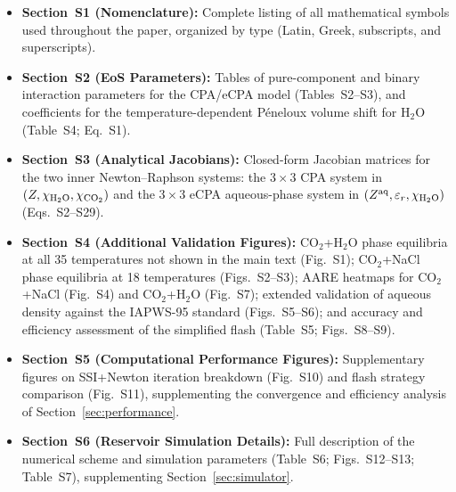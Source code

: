 \documentclass[preprint,12pt,number]{elsarticle}
\begin{document}
\begin{itemize}
  \item \textbf{Section~S1 (Nomenclature):}
        Complete listing of all mathematical symbols used throughout the paper,
        organized by type (Latin, Greek, subscripts, and superscripts).

  \item \textbf{Section~S2 (EoS Parameters):}
        Tables of pure-component and binary interaction parameters for the CPA/eCPA
        model (Tables~S2--S3), and coefficients for the temperature-dependent
        Péneloux volume shift for H$_2$O (Table~S4; Eq.~S1).

  \item \textbf{Section~S3 (Analytical Jacobians):}
        Closed-form Jacobian matrices for the two inner Newton--Raphson systems:
        the $3\times 3$ CPA system in $(Z,\chi_{\rm H_2O},\chi_{\rm CO_2})$
        and the $3\times 3$ eCPA aqueous-phase system in
        $(Z^{\rm aq},\varepsilon_r,\chi_{\rm H_2O})$ (Eqs.~S2--S29).

  \item \textbf{Section~S4 (Additional Validation Figures):}
        CO$_2$+H$_2$O phase equilibria at all 35 temperatures not shown in the main
        text (Fig.~S1); CO$_2$+NaCl phase equilibria at 18 temperatures
        (Figs.~S2--S3); AARE heatmaps for CO$_2$+NaCl (Fig.~S4) and
        CO$_2$+H$_2$O (Fig.~S7); extended validation of aqueous density against the
        IAPWS-95 standard (Figs.~S5--S6); and accuracy and efficiency assessment
        of the simplified flash (Table~S5; Figs.~S8--S9).

  \item \textbf{Section~S5 (Computational Performance Figures):}
        Supplementary figures on SSI+Newton iteration breakdown (Fig.~S10) and
        flash strategy comparison (Fig.~S11), supplementing the convergence and
        efficiency analysis of Section~\ref{sec:performance}.

  \item \textbf{Section~S6 (Reservoir Simulation Details):}
        Full description of the numerical scheme and simulation parameters
        (Table~S6; Figs.~S12--S13; Table~S7), supplementing
        Section~\ref{sec:simulator}.
\end{itemize}
\end{document}
